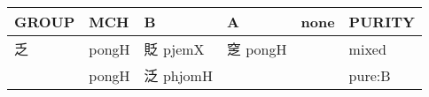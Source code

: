 \documentclass[14pt,a4paper]{scrartcl}
\begin{document}
\begin{longtable}[c]{@{}llllll@{}}
\toprule
\begin{minipage}[b]{0.14\columnwidth}\raggedright\strut
GROUP
\strut\end{minipage} &
\begin{minipage}[b]{0.14\columnwidth}\raggedright\strut
MCH
\strut\end{minipage} &
\begin{minipage}[b]{0.14\columnwidth}\raggedright\strut
B
\strut\end{minipage} &
\begin{minipage}[b]{0.14\columnwidth}\raggedright\strut
A
\strut\end{minipage} &
\begin{minipage}[b]{0.14\columnwidth}\raggedright\strut
none
\strut\end{minipage} &
\begin{minipage}[b]{0.14\columnwidth}\raggedright\strut
PURITY
\strut\end{minipage}\tabularnewline
\midrule
\endhead
\begin{minipage}[t]{0.14\columnwidth}\raggedright\strut
乏
\strut\end{minipage} &
\begin{minipage}[t]{0.14\columnwidth}\raggedright\strut
pongH
\strut\end{minipage} &
\begin{minipage}[t]{0.14\columnwidth}\raggedright\strut
貶 pjemX
\strut\end{minipage} &
\begin{minipage}[t]{0.14\columnwidth}\raggedright\strut
窆 pongH
\strut\end{minipage} &
\begin{minipage}[t]{0.14\columnwidth}\raggedright\strut
\strut\end{minipage} &
\begin{minipage}[t]{0.14\columnwidth}\raggedright\strut
mixed
\strut\end{minipage}\tabularnewline
\begin{minipage}[t]{0.14\columnwidth}\raggedright\strut
𢎘
\strut\end{minipage} &
\begin{minipage}[t]{0.14\columnwidth}\raggedright\strut
pongH
\strut\end{minipage} &
\begin{minipage}[t]{0.14\columnwidth}\raggedright\strut
泛 phjomH
\strut\end{minipage} &
\begin{minipage}[t]{0.14\columnwidth}\raggedright\strut
\strut\end{minipage} &
\begin{minipage}[t]{0.14\columnwidth}\raggedright\strut
\strut\end{minipage} &
\begin{minipage}[t]{0.14\columnwidth}\raggedright\strut
pure:B
\strut\end{minipage}\tabularnewline
\bottomrule
\end{longtable}
\end{document}
